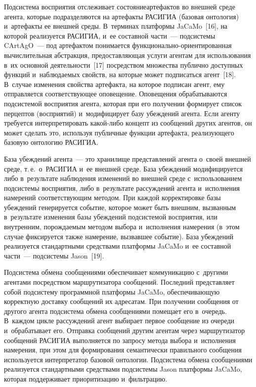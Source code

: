 \begin{multicols}{2}
  Подсистема восприятия отслеживает состояние\linebreak артефактов во внеш\-ней среде 
агента, которые подразделяются на артефакты \mbox{РАСИГИА} (базовая 
онтология) и~артефакты ее внеш\-ней среды. В~терминах плат\-фор\-мы 
JaCaMo~[16], на которой \mbox{реализуется} \mbox{РАСИГИА}, и~ее составной 
части~--- под\-сис\-те\-мы CArtAgO~--- под артефактом понимается 
функ\-цио\-наль\-но-ори\-ен\-ти\-ро\-ван\-ная вы\-чис\-ли\-тель\-ная абстракция, 
предостав\-ля\-ющая услуги агентам для использования в~их основной 
деятельности~[17] по\-сред\-ст\-вом множества пуб\-лич\-но до\-ступ\-ных функций 
и~наблюдаемых свойств, на которые может подписаться агент~[18]. В~случае 
изменения свойства артефакта, на которое подписан агент, ему отправляется 
со\-от\-вет\-ст\-ву\-ющее оповещение. Оповещения обрабатываются под\-сис\-те\-мой 
восприятия агента, которая при его получении формирует список перцептов 
(восприятий) и~модифицирует базу убеж\-де\-ний агента. Если агенту требуется 
интерпретировать ка\-кой-ли\-бо концепт из сообщений других агентов, он 
может сделать это, используя пуб\-лич\-ные функции артефакта, ре\-а\-ли\-зу\-юще\-го 
базовую онтологию \mbox{РАСИГИА}.




  База убеждений агента~--- это хранилище представлений агента о~своей 
внешней среде, т.\,е.\ о~\mbox{РАСИГИА} и~ее внеш\-ней среде. База убеждений 
модифицируется либо в~результате наблюдения изменений во внеш\-ней среде 
с~использованием под\-сис\-те\-мы восприятия, либо в~результате рас\-суж\-де\-ний агента и~исполнения намерений со\-от\-вет\-ст\-ву\-ющим методом. При каж\-дой 
корректировке базы убеж\-де\-ний генерируется событие, которое может быть 
внеш\-ним, вызванным в~результате изменения базы убеж\-де\-ний под\-сис\-те\-мой 
восприятия, или внут\-рен\-ним, по\-рож\-да\-емым методом выбора и~исполнения 
намерения (в~этом случае фиксируется так\-же намерение, вызвавшее событие). 
База убеж\-де\-ний реализуется стандартными средствами платформы JaCaMo и~ее 
со\-став\-ной части~--- под\-сис\-те\-мы Jason~[19]. 
  
  Подсистема обмена сообщениями обеспечивает коммуникацию с~другими 
агентами посредством маршрутизатора сообщений. Последний пред\-став\-ля\-ет 
собой под\-сис\-те\-му программной платформы JaCaMo, обес\-пе\-чи\-ва\-ющую 
корректную доставку сообщений их адресатам. При получении сообщения от 
другого агента под\-сис\-те\-ма обмена сообщениями помещает его в~очередь. 
В~каж\-дом цикле рассуждений агент выбирает первое сообщение из очереди 
и~обрабатывает его. Отправка сообщений другим агентам через маршрутизатор 
сообщений \mbox{РАСИГИА} выполняется по запросу метода выбора 
и~исполнения намерения, при этом для формирования семантически 
правильного сообщения используется интерпретатор базовой онтологии. 
Подсистема обмена сообщениями реализуется стандартными средствами 
под\-сис\-те\-мы Jason платформы JaCaMo, которая поддерживает приоритизацию 
и~фильт\-ра\-цию. 
  

\end{multicols}
